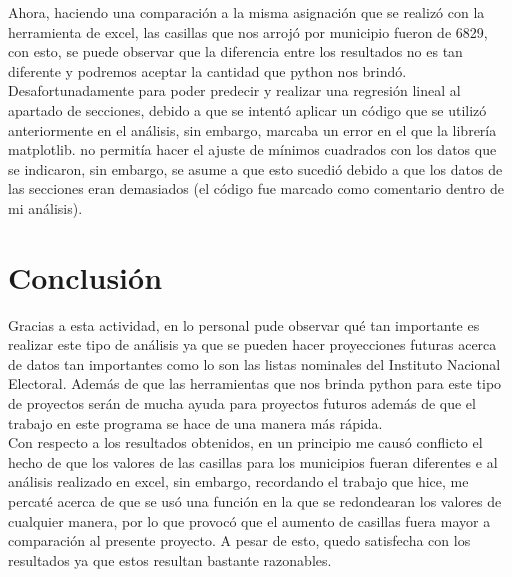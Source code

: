 \documentclass{article}
\begin{document}
\noindent Ahora, haciendo una comparación a la misma asignación que se realizó con la herramienta de excel, las casillas que nos arrojó por municipio fueron de 6829, con esto, se puede observar que la diferencia entre los resultados no es tan diferente y podremos aceptar la cantidad que python nos brindó.\\


\noindent Desafortunadamente para poder predecir y realizar una regresión lineal al apartado de secciones, debido a que se intentó aplicar un código que se utilizó anteriormente en el análisis, sin embargo, marcaba un error en el que la librería matplotlib. no permitía hacer el ajuste de mínimos cuadrados con los datos que se indicaron, sin embargo, se asume a que esto sucedió debido a que los datos de las secciones eran demasiados (el código fue marcado como comentario dentro de mi análisis).


\section{Conclusión}
Gracias a esta actividad, en lo personal pude observar qué tan importante es realizar este tipo de análisis ya que se pueden hacer proyecciones futuras acerca de datos tan importantes como lo son las listas nominales del Instituto Nacional Electoral. Además de que las herramientas que nos brinda python para este tipo de proyectos serán de mucha ayuda para proyectos futuros además de que el trabajo en este programa se hace de una manera más rápida.\\


Con respecto a los resultados obtenidos, en un principio me causó conflicto el hecho de que los valores de las casillas para los municipios fueran diferentes e al análisis realizado en excel, sin embargo, recordando el trabajo que hice, me percaté acerca de que se usó una función en la que se redondearan los valores de cualquier manera, por lo que provocó que el aumento de casillas fuera mayor a comparación al presente proyecto. A pesar de esto, quedo satisfecha con los resultados ya que estos resultan bastante razonables. 




\end{document}
